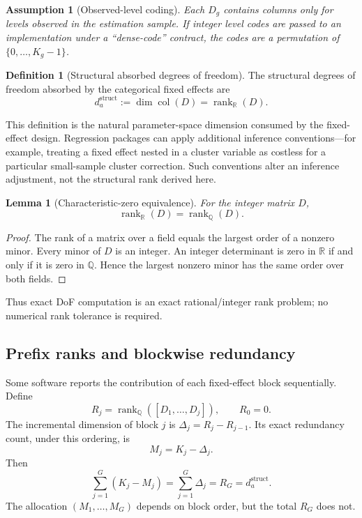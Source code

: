 \documentclass[11pt]{article}
\newtheorem{lemma}[theorem]{Lemma}
\newtheorem{assumption}[theorem]{Assumption}
\theoremstyle{definition}
\newtheorem{definition}[theorem]{Definition}
\newcommand{\R}{\mathbb{R}}
\newcommand{\Q}{\mathbb{Q}}
\newcommand{\rank}{\operatorname{rank}}
\newcommand{\col}{\operatorname{col}}
\newcommand{\1}{\mathbf{1}}
\begin{document}
\begin{assumption}[Observed-level coding]\label{ass:observed}
Each $D_g$ contains columns only for levels observed in the estimation sample. If integer level codes are passed to an implementation under a ``dense-code'' contract, the codes are a permutation of $\{0,\ldots,K_g-1\}$.
\end{assumption}

\begin{definition}[Structural absorbed degrees of freedom]
The structural degrees of freedom absorbed by the categorical fixed effects are
\begin{equation}
  d_a^{\mathrm{struct}} := \dim\col(D)=\rank_{\R}(D).
\end{equation}
\end{definition}

This definition is the natural parameter-space dimension consumed by the fixed-effect design. Regression packages can apply additional inference conventions---for example, treating a fixed effect nested in a cluster variable as costless for a particular small-sample cluster correction. Such conventions alter an inference adjustment, not the structural rank derived here.

\begin{lemma}[Characteristic-zero equivalence]\label{lem:RQ}
For the integer matrix $D$,
\begin{equation}
  \rank_{\R}(D)=\rank_{\Q}(D).
\end{equation}
\end{lemma}

\begin{proof}
The rank of a matrix over a field equals the largest order of a nonzero minor. Every minor of $D$ is an integer. An integer determinant is zero in $\R$ if and only if it is zero in $\Q$. Hence the largest nonzero minor has the same order over both fields.
\end{proof}

Thus exact DoF computation is an exact rational/integer rank problem; no numerical rank tolerance is required.

\subsection{Prefix ranks and blockwise redundancy}

Some software reports the contribution of each fixed-effect block sequentially. Define
\begin{equation}
  R_j = \rank_{\Q}([D_1,\ldots,D_j]), \qquad R_0=0.
\end{equation}
The incremental dimension of block $j$ is $\Delta_j=R_j-R_{j-1}$. Its exact redundancy count, under this ordering, is
\begin{equation}
  M_j = K_j-\Delta_j.
  \label{eq:Mj}
\end{equation}
Then
\begin{equation}
  \sum_{j=1}^{G}(K_j-M_j)=\sum_{j=1}^{G}\Delta_j=R_G=d_a^{\mathrm{struct}}.
\end{equation}
The allocation $(M_1,\ldots,M_G)$ depends on block order, but the total $R_G$ does not.
\end{document}
